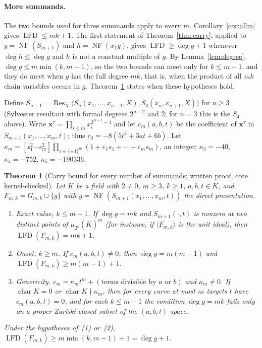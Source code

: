 \documentclass[11pt]{article}
\newtheorem{theorem}{Theorem}
\theoremstyle{definition}\newtheorem{definition}[theorem]{Definition}
\theoremstyle{remark}\newtheorem{remark}[theorem]{Remark}
\newcommand{\lfd}{\operatorname{LFD}}
\newcommand{\NF}{\operatorname{NF}}
\begin{document}
\paragraph{More summands.}
The two bounds used for three summands apply to every $m$.
Corollary~\ref{cor:allm} gives $\lfd\le mk+1$. The first statement of
Theorem~\ref{thm:carry}, applied to $g=\NF(S_{m+1})$ and $h=\NF(x_1g)$, gives
$\lfd\ge\deg g+1$ whenever $\deg h\le\deg g$ and $h$ is not a constant
multiple of $g$. By Lemma~\ref{lem:degree}, $\deg g\le m\min(k,m-1)$, so the
two bounds can meet only for $k\le m-1$, and they do meet when $g$ has the
full degree $mk$, that is, when the product of all $mk$ chain variables
occurs in $g$. Theorem~\ref{thm:allm} states when these hypotheses hold.

Define $S_{n+1}=\operatorname{Res}_X\bigl(S_n(x_1,\ldots,x_{n-1},X),S_3(x_n,x_{n+1},X)\bigr)$
for $n\ge3$ (Sylvester resultant with formal degrees $2^{n-2}$ and $2$; for
$n=3$ this is the $S_4$ above). Write
$\mathbf x^\tau=\prod_{i\le m}x_i^{2^{m-1}-1}$ and let $c_m(a,b,t)$ be the
coefficient of $\mathbf x^\tau$ in $S_{m+1}(x_1,\ldots,x_m,t)$; thus
$c_3=-8(5t^3+3at+6b)$. Let
$\kappa_m=[s_1^2\cdots s_m^2]\prod_{\varepsilon\in\{\pm1\}^m}(1+\varepsilon_1s_1+\cdots+\varepsilon_ms_m)$,
an integer; $\kappa_3=-40$, $\kappa_4=-752$, $\kappa_5=-190336$.

\begin{theorem}[Carry bound for every number of summands; written proof, core kernel-checked]\label{thm:allm}
Let $K$ be a field with $2\ne0$, $m\ge3$, $k\ge1$, $a,b,t\in K$, and
$F_{m,k}=G_{m,k}\cup\{g\}$ with $g=\NF(S_{m+1}(x_1,\ldots,x_m,t))$ the direct
presentation.
\begin{enumerate}
\item \emph{Exact value, $k\le m-1$.} If $\deg g=mk$ and
 $S_{m+1}(\cdot,t)$ is nonzero at two distinct points of
 $\mu_{2^k}(\bar K)^m$ (for instance, if $\langle F_{m,k}\rangle$ is the unit
 ideal), then $\lfd(F_{m,k})=mk+1$.
\item \emph{Onset, $k\ge m$.} If $c_m(a,b,t)\ne0$, then $\deg g=m(m-1)$ and
 $\lfd(F_{m,k})\ge m(m-1)+1$.
\item \emph{Genericity.} $c_m=\kappa_mt^m+(\text{terms divisible by }a\text{ or }b)$
 and $\kappa_m\ne0$. If $\operatorname{char}K=0$ or
 $\operatorname{char}K\nmid\kappa_m$, then for every curve at most $m$
 targets $t$ have $c_m(a,b,t)=0$, and for each $k\le m-1$ the condition
 $\deg g=mk$ fails only on a proper Zariski-closed subset of the
 $(a,b,t)$-space.
\end{enumerate}
Under the hypotheses of~(1) or~(2),
$\lfd(F_{m,k})\ge m\min(k,m-1)+1=\deg g+1$.
\end{theorem}
\end{document}
